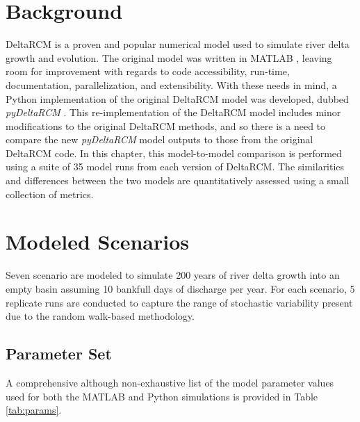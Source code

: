 \section{Background}
DeltaRCM \cite{Liang2015a,Liang2015} is a proven \cite{Liang2015,Liang2016a} and popular \cite{Liang2016,Lauzon2018, Lauzon2019,Piliouras2021} numerical model used to simulate river delta growth and evolution.
The original model was written in MATLAB \cite{MATLAB:R2019b_u4}, leaving room for improvement with regards to code accessibility, run-time, documentation, parallelization, and extensibility.
With these needs in mind, a Python \cite{PythonSoftwareFoundation2016} implementation of the original DeltaRCM model was developed, dubbed \textit{pyDeltaRCM} \cite{Moodie2021}.
This re-implementation of the DeltaRCM model includes minor modifications to the original DeltaRCM methods, and so there is a need to compare the new \textit{pyDeltaRCM} model outputs to those from the original DeltaRCM code. 
In this chapter, this model-to-model comparison is performed using a suite of 35 model runs from each version of DeltaRCM.
The similarities and differences between the two models are quantitatively assessed using a small collection of metrics.

\section{Modeled Scenarios}
Seven scenario are modeled to simulate 200 years of river delta growth into an empty basin assuming 10 bankfull days of discharge per year.
For each scenario, 5 replicate runs are conducted to capture the range of stochastic variability present due to the random walk-based methodology.

\subsection{Parameter Set}
A comprehensive although non-exhaustive list of the model parameter values used for both the MATLAB and Python simulations is provided in Table \ref{tab:params}.

